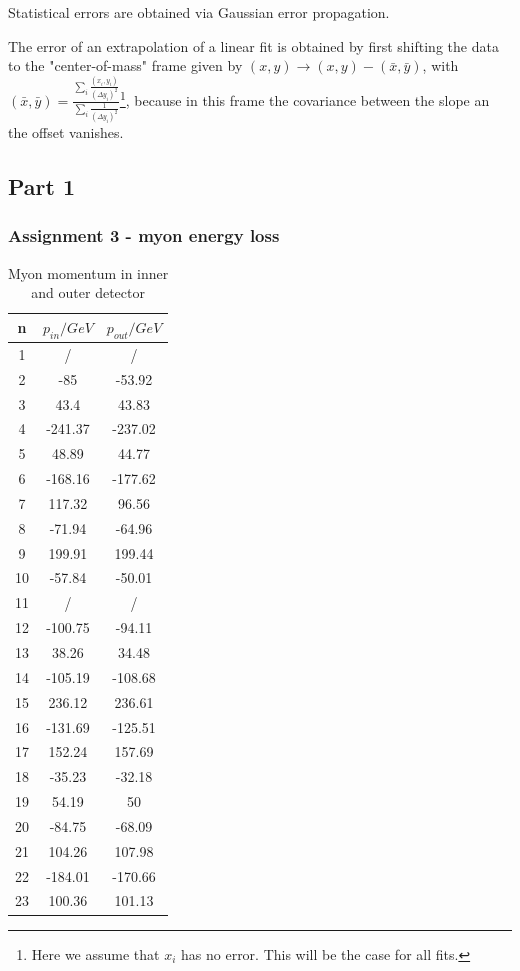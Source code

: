 Statistical errors are obtained via Gaussian error propagation. 

The error of an extrapolation of a linear fit is obtained by first shifting the data to the "center-of-mass" frame given by $(x,y) \to (x,y) - (\bar{x},\bar{y})$, with $(\bar{x},\bar{y}) = \frac{\sum_i \frac{(x_i,y_i)}{(\Delta y_i)^2}}{\sum_i \frac{1}{(\Delta y_i)^2}}$\footnote{Here we assume that $x_i$ has no error. This will be the case for all fits.}, because in this frame the covariance between the slope an the offset vanishes.

\subsection{Part 1}
\subsubsection{Assignment 3 - myon energy loss}

\begin{table}
\centering
\caption{Myon momentum in inner and outer detector}
\begin{tabular}{ccc}
\toprule
n & $p_{in}/\si{GeV}$ & $p_{out}/\si{GeV}$\\
\midrule
1 & / & /\\
2&	-85&	-53.92\\
3&	43.4&	43.83\\
4&	-241.37&	-237.02\\
5&	48.89&	44.77\\
6&	-168.16&	-177.62\\
7&	117.32&	96.56\\
8&	-71.94&	-64.96\\
9&	199.91&	199.44\\
10&	-57.84&	-50.01\\
11&	/ & /\\
12&-100.75&	-94.11\\
13&	38.26&	34.48\\
14&	-105.19&	-108.68\\
15&	236.12&	236.61\\
16&	-131.69&	-125.51\\
17&	152.24&	157.69\\
18&	-35.23&	-32.18\\
19&	54.19&	50\\
20&	-84.75&	-68.09\\
21&	104.26&	107.98\\
22&	-184.01&	-170.66\\
23&	100.36&	101.13\\
\bottomrule
\end{tabular}
\label{tab:task1_myon}
\end{table}

